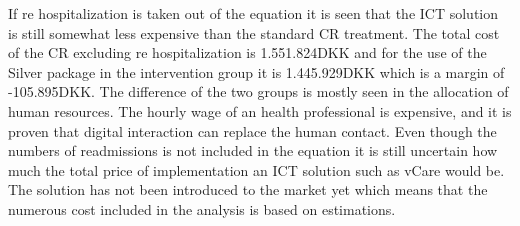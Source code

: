 If re hospitalization is taken out of the equation it is seen that the ICT solution is still somewhat less expensive than the standard CR treatment. The total cost of the CR excluding re hospitalization is 1.551.824DKK and for the use of the Silver package in the intervention group it is 1.445.929DKK which is a margin of -105.895DKK. The difference of the two groups is mostly seen in the allocation of human resources. The hourly wage of an health professional is expensive, and it is proven that digital interaction can replace the human contact. Even though the numbers of readmissions is not included in the equation it is still uncertain how much the total price of implementation an ICT solution such as vCare would be. The solution has not been introduced to the market yet which means that the numerous cost included in the analysis is based on estimations. 


